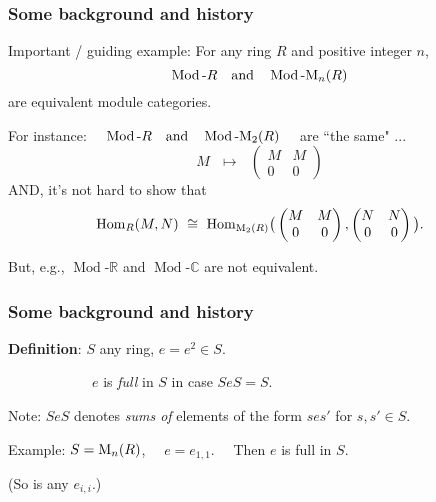 \documentclass{beamer}
\newcommand{\rmod}[1]{\operatorname{Mod}\text{-}#1}
\begin{document}
\begin{frame}
\frametitle{Some background and history}


Important / guiding example:
For any ring $R$ and positive integer $n$, 
$$\rmod{R} \ \ \mbox{ and } \ \ \rmod{{\rm M}_n(R)}$$
 are equivalent module categories.  
 
  \bigskip
 \pause
 
For instance:      \ \ $\rmod{R} \ \ \mbox{ and } \ \ \rmod{{\rm M}_2(R)}$ \ \   are ``the same" ... 
$$M  \ \ \ \mapsto \ \ \  \begin{pmatrix}
M & M \\
0 & 0 
\end{pmatrix}$$
AND, it's not hard to show that 
$${\rm Hom}_R(M,N) \ \cong \ {\rm Hom}_{{\rm M}_2(R)} \big( \begin{pmatrix}
M & M \\
0 & 0 
\end{pmatrix},\begin{pmatrix}
N & N \\
 0 & 0 
\end{pmatrix} \big).$$
 
 
 \pause
 
 But, e.g.,  $\rmod{\mathbb{R}}$ and $\rmod{\mathbb{C}}$ are not equivalent.  


\end{frame}



\begin{frame}
\frametitle{Some background and history}

{\bf Definition}:   $S$ any ring, $e = e^2 \in S$.  

\medskip

\ \ \ \ \ \ \ \ \ \ \ \   $e$ is {\it full} in $S$ in case $SeS = S$.   

\bigskip

Note:   $SeS$ denotes {\it sums of} elements of the form $ses'$ for $s,s' \in S$.

\bigskip

Example:  $S = {\rm M}_n(R)$,  \ \ $e = e_{1,1}$.  \ \  Then $e$ is full in $S$.   

\medskip

(So is any $e_{i,i}$.)  





\end{frame}
\end{document}
